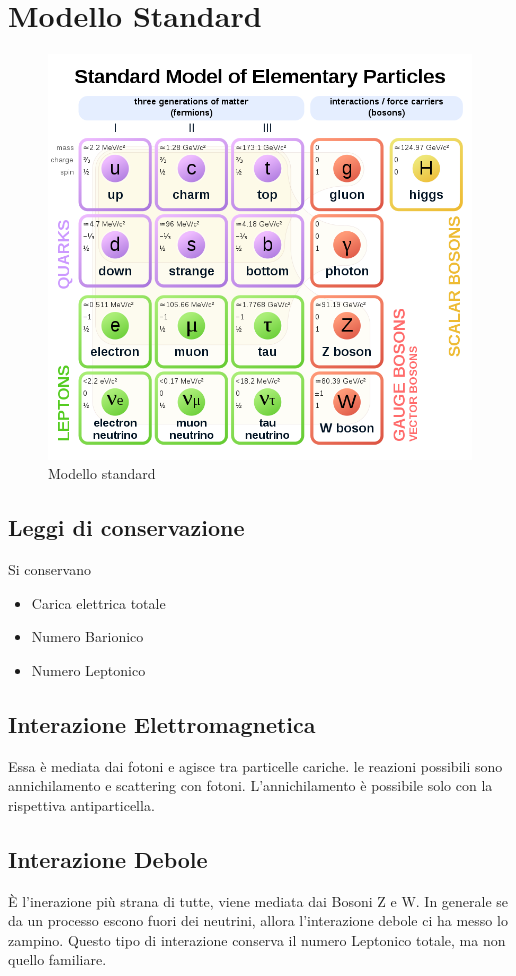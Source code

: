 \documentclass[11pt,a4paper]{report}
\begin{document}
	\section{Modello Standard}
	\begin{figure}[h]
		\centering
    	\includegraphics[width=\linewidth]{Immagini/Modello_standard.png}
		\caption{Modello standard}
		\label{fig:mod_std}
	\end{figure}
	\subsection{Leggi di conservazione}
		Si conservano
		\begin{itemize}
			\item Carica elettrica totale
			\item Numero Barionico
			\item Numero Leptonico
		\end{itemize}
	\subsection{Interazione Elettromagnetica}
		Essa è mediata dai fotoni e agisce tra particelle cariche. le reazioni possibili sono annichilamento e scattering con fotoni. L'annichilamento è possibile solo con la rispettiva antiparticella.
	\subsection{Interazione Debole}
		È l'inerazione più strana di tutte, viene mediata dai Bosoni Z e W. In generale se da un processo escono fuori dei neutrini, allora l'interazione debole ci ha messo lo zampino.\newline
		Questo tipo di interazione conserva il numero Leptonico totale, ma non quello familiare.
\end{document}
